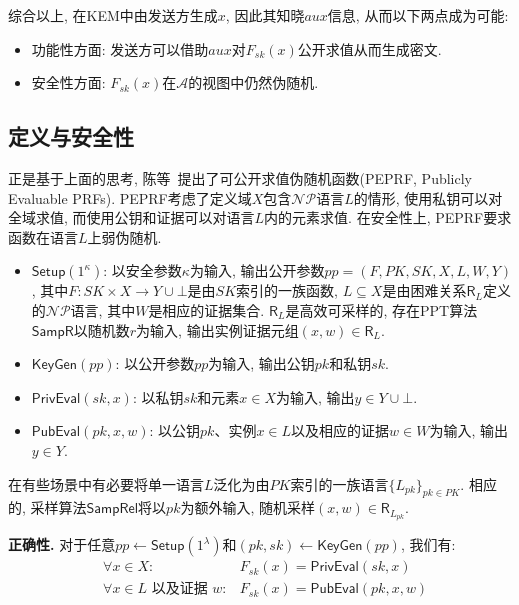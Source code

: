综合以上, 在KEM中由发送方生成$x$, 因此其知晓$aux$信息, 从而以下两点成为可能: 
\begin{itemize}
    \item 功能性方面: 发送方可以借助$aux$对$F_{sk}(x)$公开求值从而生成密文.  
    \item 安全性方面: $F_{sk}(x)$在$\mathcal{A}$的视图中仍然伪随机.  
\end{itemize}

\subsection{定义与安全性}
正是基于上面的思考, 陈等~\cite{Chen-SCN-2014}提出了可公开求值伪随机函数(PEPRF, Publicly Evaluable PRFs). 
PEPRF考虑了定义域$X$包含$\mathcal{NP}$语言$L$的情形, 使用私钥可以对全域求值, 而使用公钥和证据可以对语言$L$内的元素求值. 
在安全性上, PEPRF要求函数在语言$L$上弱伪随机.  
\begin{definition}[可公开求值伪随机函数]\label{definition:PEPRF}
\begin{itemize} 
\item $\mathsf{Setup}(1^\kappa)$: 以安全参数$\kappa$为输入, 输出公开参数$pp = (F, PK, SK, X, L, W, Y)$, 
    其中$F: SK \times X \rightarrow Y \cup \bot$是由$SK$索引的一族函数, 
    $L \subseteq X$是由困难关系$\mathsf{R}_L$定义的$\mathcal{NP}$语言, 其中$W$是相应的证据集合. 
    $\mathsf{R}_L$是高效可采样的, 存在PPT算法$\mathsf{SampR}$以随机数$r$为输入, 
    输出实例证据元组$(x, w) \in \mathsf{R}_L$.   

\item $\mathsf{KeyGen}(pp)$: 以公开参数$pp$为输入, 输出公钥$pk$和私钥$sk$.   
    
\item $\mathsf{PrivEval}(sk, x)$: 以私钥$sk$和元素$x \in X$为输入, 输出$y \in Y \cup \bot$.  

\item $\mathsf{PubEval}(pk, x, w)$: 以公钥$pk$、实例$x \in L$以及相应的证据$w \in W$为输入, 输出$y \in Y$.  
\end{itemize}
\end{definition}

\begin{remark} 
在有些场景中有必要将单一语言$L$泛化为由$PK$索引的一族语言$\{L_{pk}\}_{pk \in PK}$. 
相应的, 采样算法$\mathsf{SampRel}$将以$pk$为额外输入, 随机采样$(x, w) \in \mathsf{R}_{L_{pk}}$. 
\end{remark}

\begin{trivlist}
\item \textbf{正确性.} 对于任意$pp \leftarrow \mathsf{Setup}(1^\lambda)$和$(pk, sk) \leftarrow \mathsf{KeyGen}(pp)$, 我们有:
\begin{eqnarray*}
    & \forall x \in X: & F_{sk}(x) = \mathsf{PrivEval}(sk, x)\\
    & \forall x \in L \text{~以及证据~} w: & F_{sk}(x) = \mathsf{PubEval}(pk, x, w)
\end{eqnarray*} 
\end{trivlist}

